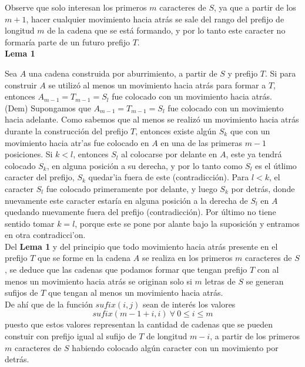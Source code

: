 \documentclass[a4paper]{article}
\begin{document}
    Observe que solo interesan los primeros $m$ caracteres de $S$, ya que a partir de los $m+1$,
    hacer cualquier movimiento hacia atr\'as se sale del rango del prefijo de longitud $m$ de la
    cadena que se est\'a formando, y por lo tanto este caracter no formar\'ia parte de un
    futuro prefijo $T$. \\

    \textbf{Lema 1}

    Sea $A$ una cadena construida por aburrimiento, a partir de $S$ y prefijo $T$.
    Si para construir $A$ se utiliz\'o al menos un movimiento hacia atr\'as para formar a $T$,
    entonces $A_{m-1} = T_{m-1} = S_{l}$ fue colocado con un movimiento hacia atr\'as. \\
    
    (Dem) Supongamos que $A_{m-1} = T_{m-1} = S_{l}$ fue colocado con un movimiento hacia adelante.
    Como sabemos que al menos se realiz\'o un movimiento hacia atr\'as durante la construcci\'on
    del prefijo $T$, entonces existe alg\'un $S_{k}$ que con un movimiento hacia atr'as fue colocado
    en $A$ en una de las primeras $m-1$ posiciones. Si $k<l$, entonces $S_l$ al colocarse por delante
    en $A$, este ya tendr\'a colocado $S_k$, en alguna posici\'on a su derecha, y por lo tanto
    como $S_l$ es el \'utlimo caracter del prefijo, $S_k$ quedar'ia fuera de este (contradicci\'on).
    Para $l<k$, el caracter $S_l$ fue colocado primeramente por delante, y luego $S_k$ por detr\'as,
    donde nuevamente este caracter estar\'ia en alguna posici\'on a la derecha de $S_l$ en $A$
    quedando nuevamente fuera del prefijo (contradicci\'on).
    Por \'ultimo no tiene sentido tomar $k=l$, porque este se pone por alante bajo la suposici\'on
    y entramos en otra contradicci'on.\\

    Del \textbf{Lema 1} y del principio que todo movimiento hacia atr\'as presente en el prefijo $T$ que se forme en la 
    cadena $A$ se realiza en los primeros $m$ caracteres de $S$, se deduce que las cadenas que podamos formar que tengan prefijo $T$ con al menos un 
    movimiento hacia atr\'as se originan solo si $m$ letras de $S$ se generan sufijos de $T$ que tengan al menos un movimiento hacia atr\'as. \\

    De ah\'i que de la funci\'on $sufix(i,j)$ sean de inter\'es los valores $$sufix(m -1 +i, i)~ \forall~0 \leq i \leq m$$ puesto que estos valores representan la cantidad
    de cadenas que se pueden constuir con prefijo igual al sufijo de $T$ de longitud $m-i$, a partir de los primeros $m$ caracteres de $S$ habiendo colocado alg\'un caracter con un
    movimiento por detr\'as.\\
    
\end{document}
